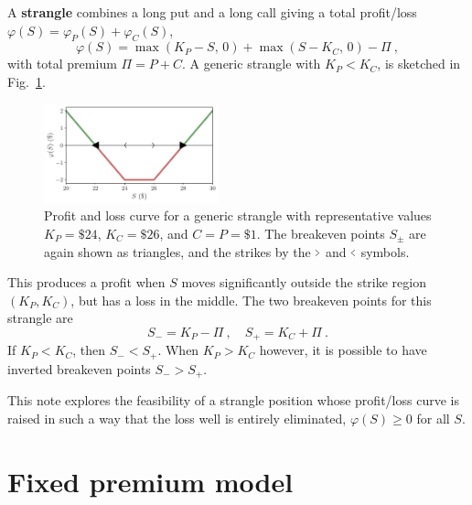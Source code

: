 \documentclass[aps,reprint]{revtex4-2}
\begin{document}
A \textbf{strangle} combines a long put and a long call giving a total profit/loss
$\varphi(S)= \varphi_P(S) + \varphi_C(S)$,
\begin{equation}
\varphi(S) = \max(K_P - S,\,0) + \max(S - K_C,\,0) - \Pi~,
\end{equation}
with total premium $\Pi = P + C$.  
A generic strangle with $K_P < K_C$, is sketched in Fig.~\ref{fig:strangle}.
\begin{figure}[hb]
    \centering
    \includegraphics[width=0.45\textwidth]{figs/strangle.pdf}
    \caption{Profit and loss curve for a generic strangle with representative values
    $K_P = \$24$, $K_C = \$26$, and $C = P = \$1$.
    The breakeven points $S_\pm$ are again shown as triangles, and the strikes by the $ \scalebox{0.5}[1]{$>$} $ and $\scalebox{0.5}[1]{$<$}$ symbols. }
    \label{fig:strangle}
\end{figure}
This produces a profit when $S$ moves significantly outside the strike region $(K_P, K_C)$, but has a loss in the middle. 
The two breakeven points for this strangle are
\begin{equation}
S_{-} = K_P - \Pi~, 
\quad 
S_{+} = K_C + \Pi~.
\end{equation}
If $K_P < K_C$, then $S_{-} < S_{+}$.  When $K_P > K_C$ however, it is possible to have inverted breakeven points $S_{-} > S_{+}$.

This note explores the feasibility of a strangle position whose profit/loss curve is raised in such a way that the loss well is entirely eliminated,  $\varphi(S) \ge 0$ for all $S$. 

\section{Fixed premium model}
\end{document}
